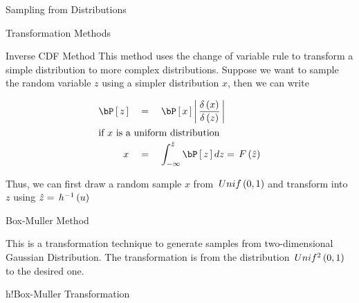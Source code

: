 \documentclass{article}
\begin{document}
\begin{ssection}{Sampling from Distributions}
\begin{ssubsection}{Transformation Methods}
\begin{sssubsection}{Inverse CDF Method}
			This method uses the change of variable rule to transform a simple distribution to more complex distributions. Suppose we want to sample the random variable $z$ using a simpler distribution $x$, then we can write

			\begin{align*}
				\prob{z}	&\eq \prob{x} \abs{\derp{x}{z}} \\
				\shortintertext{if $x$ is a uniform distribution}
				x			&\eq \int_{-\infty}^{\hat{z}} \prob{z} dz = \func{F}{\hat{z}}
			\end{align*}

			Thus, we can first draw a random sample $x$ from $\func{Unif}{0, 1}$ and transform into $z$ using $\hat{z} = \funcinv{h}{u}$

		\end{sssubsection}

		\begin{sssubsection}{Box-Muller Method}

			This is a transformation technique to generate samples from two-dimensional Gaussian Distribution. The transformation is from the distribution $\func{Unif^2}{0, 1}$ to the desired one. \br%

			\begin{algo}{h!}{Box-Muller Transformation}


\end{algo}
\end{sssubsection}
\end{ssubsection}
\end{ssection}
\end{document}
